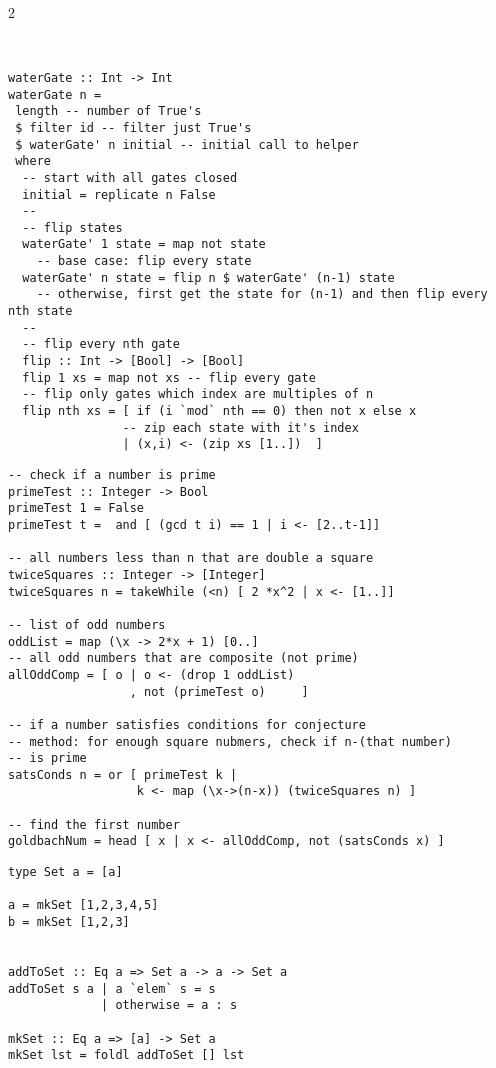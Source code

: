 \documentclass{article}
\def \columncount {2}
\begin{document}
\begin{multicols*}{\columncount}
\begin{outline}[longenum]
\begin{verbatim}


waterGate :: Int -> Int
waterGate n =
 length -- number of True's
 $ filter id -- filter just True's
 $ waterGate' n initial -- initial call to helper
 where
  -- start with all gates closed
  initial = replicate n False
  --
  -- flip states
  waterGate' 1 state = map not state 
    -- base case: flip every state
  waterGate' n state = flip n $ waterGate' (n-1) state
    -- otherwise, first get the state for (n-1) and then flip every nth state
  --
  -- flip every nth gate
  flip :: Int -> [Bool] -> [Bool]
  flip 1 xs = map not xs -- flip every gate
  -- flip only gates which index are multiples of n
  flip nth xs = [ if (i `mod` nth == 0) then not x else x
                -- zip each state with it's index
                | (x,i) <- (zip xs [1..])  ]

\end{verbatim}

\begin{verbatim}
-- check if a number is prime
primeTest :: Integer -> Bool
primeTest 1 = False
primeTest t =  and [ (gcd t i) == 1 | i <- [2..t-1]]

-- all numbers less than n that are double a square
twiceSquares :: Integer -> [Integer]
twiceSquares n = takeWhile (<n) [ 2 *x^2 | x <- [1..]]

-- list of odd numbers
oddList = map (\x -> 2*x + 1) [0..]
-- all odd numbers that are composite (not prime)
allOddComp = [ o | o <- (drop 1 oddList)
                 , not (primeTest o)     ]

-- if a number satisfies conditions for conjecture
-- method: for enough square nubmers, check if n-(that number)
-- is prime
satsConds n = or [ primeTest k | 
                  k <- map (\x->(n-x)) (twiceSquares n) ]

-- find the first number 
goldbachNum = head [ x | x <- allOddComp, not (satsConds x) ]
\end{verbatim}


\begin{verbatim}
type Set a = [a]

a = mkSet [1,2,3,4,5]
b = mkSet [1,2,3]


addToSet :: Eq a => Set a -> a -> Set a
addToSet s a | a `elem` s = s
             | otherwise = a : s

mkSet :: Eq a => [a] -> Set a
mkSet lst = foldl addToSet [] lst


\end{verbatim}
\end{outline}
\end{multicols*}
\end{document}
